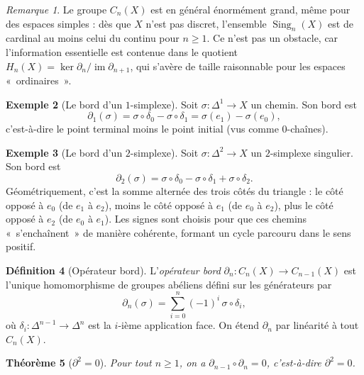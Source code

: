 \documentclass[12pt,a4paper,openany]{book}
\theoremstyle{definition}
\newtheorem{definition}{Définition}[chapter]
\newtheorem{exemple}[definition]{Exemple}
\theoremstyle{plain}
\newtheorem{theoreme}[definition]{Théorème}
\theoremstyle{remark}
\newtheorem{remarque}[definition]{Remarque}
\DeclareMathOperator{\im}{im}
\begin{document}
\begin{remarque}\label{rem:chaines-enormes}
Le groupe $C_n(X)$ est en général énormément grand, même pour des espaces simples : dès que
$X$ n'est pas discret, l'ensemble $\operatorname{Sing}_n(X)$ est de cardinal au moins celui du
continu pour $n \geq 1$. Ce n'est pas un obstacle, car l'information essentielle est contenue
dans le quotient $H_n(X) = \ker \partial_n / \im \partial_{n+1}$, qui s'avère de taille
raisonnable pour les espaces «~ordinaires~».
\end{remarque}

\begin{exemple}[Le bord d'un $1$-simplexe]\label{ex:bord-1-simplexe}
Soit $\sigma \colon \Delta^1 \to X$ un chemin. Son bord est
\[
  \partial_1(\sigma) = \sigma \circ \delta_0 - \sigma \circ \delta_1 = \sigma(e_1) - \sigma(e_0),
\]
c'est-à-dire le point terminal moins le point initial (vus comme $0$-chaînes).
\end{exemple}

\begin{exemple}[Le bord d'un $2$-simplexe]\label{ex:bord-2-simplexe}
Soit $\sigma \colon \Delta^2 \to X$ un $2$-simplexe singulier. Son bord est
\[
  \partial_2(\sigma) = \sigma \circ \delta_0 - \sigma \circ \delta_1 + \sigma \circ \delta_2.
\]
Géométriquement, c'est la somme alternée des trois côtés du triangle : le côté opposé à $e_0$
(de $e_1$ à $e_2$), moins le côté opposé à $e_1$ (de $e_0$ à $e_2$), plus le côté opposé à
$e_2$ (de $e_0$ à $e_1$). Les signes sont choisis pour que ces chemins «~s'enchaînent~»
de manière cohérente, formant un cycle parcouru dans le sens positif.
\end{exemple}

\begin{definition}[Opérateur bord]\label{def:operateur-bord}
L'\emph{opérateur bord} $\partial_n \colon C_n(X) \to C_{n-1}(X)$ est l'unique homomorphisme de
groupes abéliens défini sur les générateurs par
\[
  \partial_n(\sigma) = \sum_{i=0}^{n} (-1)^i \, \sigma \circ \delta_i,
\]
où $\delta_i \colon \Delta^{n-1} \to \Delta^n$ est la $i$-ième application face. On étend $\partial_n$
par linéarité à tout $C_n(X)$.
\end{definition}

\begin{theoreme}[$\partial^2 = 0$]\label{thm:bord-carre-nul}
Pour tout $n \geq 1$, on a $\partial_{n-1} \circ \partial_n = 0$, c'est-à-dire
$\partial^2 = 0$.
\end{theoreme}
\end{document}
